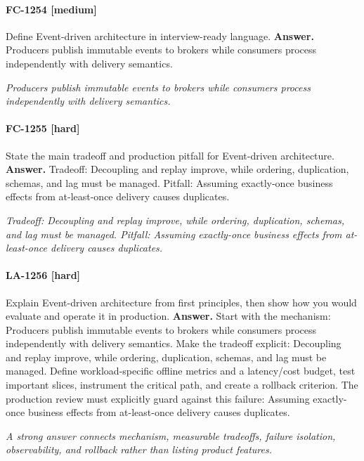 \paragraph{FC-1254 [medium]} Define Event-driven architecture in interview-ready language.
\noindent\textbf{Answer.} Producers publish immutable events to brokers while consumers process independently with delivery semantics.
\par\textit{Producers publish immutable events to brokers while consumers process independently with delivery semantics.}
\paragraph{FC-1255 [hard]} State the main tradeoff and production pitfall for Event-driven architecture.
\noindent\textbf{Answer.} Tradeoff: Decoupling and replay improve, while ordering, duplication, schemas, and lag must be managed. Pitfall: Assuming exactly-once business effects from at-least-once delivery causes duplicates.
\par\textit{Tradeoff: Decoupling and replay improve, while ordering, duplication, schemas, and lag must be managed. Pitfall: Assuming exactly-once business effects from at-least-once delivery causes duplicates.}
\paragraph{LA-1256 [hard]} Explain Event-driven architecture from first principles, then show how you would evaluate and operate it in production.
\noindent\textbf{Answer.} Start with the mechanism: Producers publish immutable events to brokers while consumers process independently with delivery semantics. Make the tradeoff explicit: Decoupling and replay improve, while ordering, duplication, schemas, and lag must be managed. Define workload-specific offline metrics and a latency/cost budget, test important slices, instrument the critical path, and create a rollback criterion. The production review must explicitly guard against this failure: Assuming exactly-once business effects from at-least-once delivery causes duplicates.
\par\textit{A strong answer connects mechanism, measurable tradeoffs, failure isolation, observability, and rollback rather than listing product features.}
